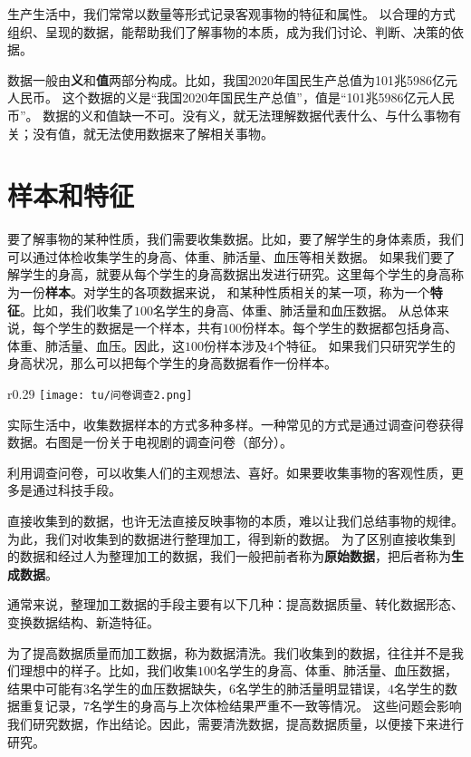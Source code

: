 \documentclass[12pt,UTF8]{ctexbook}
\theoremstyle{definition}
\theoremstyle{plain}
\begin{document}
生产生活中，我们常常以数量等形式记录客观事物的特征和属性。
以合理的方式组织、呈现的数据，能帮助我们了解事物的本质，成为我们讨论、判断、决策的依据。

数据一般由\textbf{义}和\textbf{值}两部分构成。比如，我国2020年国民生产总值为101兆5986亿元人民币。
这个数据的义是“我国2020年国民生产总值”，值是“101兆5986亿元人民币”。
数据的义和值缺一不可。没有义，就无法理解数据代表什么、与什么事物有关；没有值，就无法使用数据来了解相关事物。

\section{样本和特征}
要了解事物的某种性质，我们需要收集数据。比如，要了解学生的身体素质，我们可以通过体检收集学生的身高、体重、肺活量、血压等相关数据。
如果我们要了解学生的身高，就要从每个学生的身高数据出发进行研究。这里每个学生的身高称为一份\textbf{样本}。对学生的各项数据来说，
和某种性质相关的某一项，称为一个\textbf{特征}。比如，我们收集了$100$名学生的身高、体重、肺活量和血压数据。
从总体来说，每个学生的数据是一个样本，共有$100$份样本。每个学生的数据都包括身高、体重、肺活量、血压。因此，这$100$份样本涉及$4$个特征。
如果我们只研究学生的身高状况，那么可以把每个学生的身高数据看作一份样本。


\begin{wrapfigure}[10]{r}{0.29\textwidth} %
    \vspace{-20pt}
    \flushright
    \texttt{[image: tu/问卷调查2.png]}
\end{wrapfigure}

实际生活中，收集数据样本的方式多种多样。一种常见的方式是通过调查问卷获得数据。右图是一份关于电视剧的调查问卷（部分）。

利用调查问卷，可以收集人们的主观想法、喜好。如果要收集事物的客观性质，更多是通过科技手段。

直接收集到的数据，也许无法直接反映事物的本质，难以让我们总结事物的规律。
为此，我们对收集到的数据进行整理加工，得到新的数据。
为了区别直接收集到的数据和经过人为整理加工的数据，我们一般把前者称为\textbf{原始数据}，把后者称为\textbf{生成数据}。

通常来说，整理加工数据的手段主要有以下几种：提高数据质量、转化数据形态、变换数据结构、新造特征。

为了提高数据质量而加工数据，称为数据清洗。我们收集到的数据，往往并不是我们理想中的样子。比如，我们收集$100$名学生的身高、体重、肺活量、血压数据，
结果中可能有$3$名学生的血压数据缺失，$6$名学生的肺活量明显错误，$4$名学生的数据重复记录，$7$名学生的身高与上次体检结果严重不一致等情况。
这些问题会影响我们研究数据，作出结论。因此，需要清洗数据，提高数据质量，以便接下来进行研究。
\end{document}
